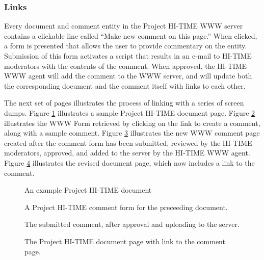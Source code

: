 \subsubsection{Links}

Every document and comment entity in the Project HI-TIME WWW server contains
a clickable line called ``Make new comment on this page.''  When clicked,
a form is presented that allows the user to provide commentary on the
entity.  Submission of this form activates a script that results in an
e-mail to HI-TIME moderators with the contents of the comment.  When 
approved, the HI-TIME WWW agent will add the comment to the WWW server, 
and will update both the corresponding document and the comment itself
with links to each other.  

The next set of pages illustrates the process of linking with a series
of screen dumps.  Figure \ref{fig:document-example-initial}
illustrates a sample Project HI-TIME document page.  Figure 
\ref{fig:comment-form} illustrates the WWW Form retrieved by clicking on
the link to create a comment, along with a sample comment.    Figure 
\ref{fig:comment-example} illustrates the new WWW comment page created 
after the comment form has been submitted, reviewed by the HI-TIME
moderators, approved, and added to the server by the HI-TIME WWW agent.
Figure \ref{fig:document-example-annotated} illustrates the revised
document page, which now includes a link to the comment. 


\begin{figure}[htbp]
  \centerline{} 
\caption{An example Project HI-TIME document} 
\label{fig:document-example-initial}
\end{figure}

\begin{figure}[htbp]
  \centerline{} 
\caption{A Project HI-TIME comment form for the preceeding document.}
\label{fig:comment-form}
\end{figure}

\begin{figure}[htbp]
  \centerline{} 
\caption{The submitted comment, after approval and uploading to the server.} 
\label{fig:comment-example}
\end{figure}

\begin{figure}[htbp]
  \centerline{} 
\caption{The Project HI-TIME document page with link to the comment
         page.}
\label{fig:document-example-annotated}
\end{figure}

